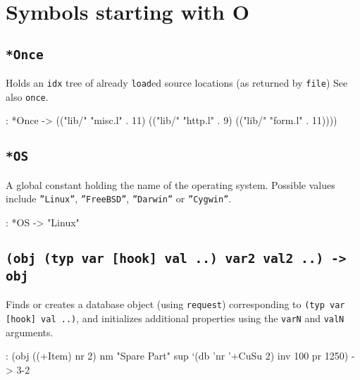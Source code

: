 %
%
%


\chapter{Symbols starting with O}
\label{cha:func-ref-O-functions-starting-with-O}
 
\section*{\texttt{*Once}}
\label{sec:func-ref-O-*Once}


Holds an \texttt{idx} tree of already \texttt{load}ed source locations (as returned by \texttt{file}) See also \texttt{once}.


\begin{wideverbatim}
: *Once
-> (("lib/" "misc.l" . 11) (("lib/" "http.l" . 9) (("lib/" "form.l" . 11))))
\end{wideverbatim}

 
\section*{\texttt{*OS}}
\label{sec:func-ref-O-*OS}


A global constant holding the name of the operating system. Possible
values include \texttt{''Linux''}, \texttt{''FreeBSD''},
\texttt{''Darwin''} or \texttt{''Cygwin''}.


\begin{wideverbatim}
: *OS
-> "Linux"
\end{wideverbatim}

 
\section*{\texttt{(obj (typ var [hook] val ..) var2 val2 ..) -> obj}}
\label{sec:func-ref-O-(obj (typ var [hook] val ..) var2 val2 ..) -> obj}


Finds or creates a database object (using \texttt{request}) corresponding to
\texttt{(typ var [hook] val ..)}, and initializes additional properties using
the \texttt{varN} and \texttt{valN} arguments.


\begin{wideverbatim}
: (obj ((+Item) nr 2) nm "Spare Part" sup `(db 'nr '+CuSu 2) inv 100 pr 1250)
-> {3-2}
\end{wideverbatim}

